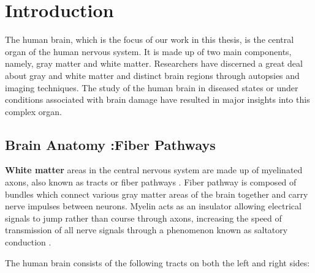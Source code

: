 \documentclass[../structure.tex]{subfiles}
\begin{document}
\chapter{Introduction}

	The human brain, which is the focus of our work in this thesis, is the central organ of the human nervous system. It is made up of two main components, namely, gray 	     			    matter and white matter. Researchers have discerned a great deal about gray and white matter and distinct brain regions through autopsies and imaging techniques. The study 		of the human brain in diseased states or under conditions associated with brain damage have resulted in major insights into this complex organ.

\section{Brain Anatomy :Fiber Pathways}

	 \textbf{White matter} areas in the central nervous system are made up of myelinated axons, also known as tracts or fiber pathways \cite{Blumenfeld2010}. Fiber pathway is composed of bundles which connect various gray matter areas of the brain together and carry nerve impulses between neurons. Myelin acts as an insulator allowing electrical signals to jump rather than course through axons, increasing the speed of transmission of all nerve signals through a phenomenon known as saltatory conduction \cite{Klein2008}.
	
	The human brain consists of the following tracts on both the left and right sides:
	\begin{comment}
   \begin{itemize}
       \item Anterior Thalamic Radiation (ATR)
       \item Corpus Callosum (CC)
       \item Genu of the Corpus Callosum (genu)
       \item Splenium of the Corpus Callosum (splenium)
       \item Body of Corpus Callosum (truncus)
		\item Cingulum (Cing)
		\item Corticospinal Tract (CST)
		\item Inferior Fronto-occipital Fasciculus (IFO)
		\item Inferior Longitudinal Fasciculus (ILF)
		\item Superior Longitudinal Fasciculus (SLF)
		\item Ventral Tegmental Area (VTA)
	\end{itemize}
	\end{comment}
\end{document}

